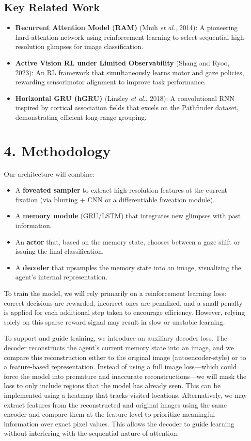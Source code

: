 \documentclass[12pt,a4paper]{article}
\begin{document}
\subsection*{Key Related Work}
\begin{itemize}[leftmargin=*]
  \item \textbf{Recurrent Attention Model (RAM)} (Mnih \emph{et al.}, 2014): A pioneering hard-attention network using reinforcement learning to select sequential high-resolution glimpses for image classification.
  \item \textbf{Active Vision RL under Limited Observability} (Shang and Ryoo, 2023): An RL framework that simultaneously learns motor and gaze policies, rewarding sensorimotor alignment to improve task performance.
  \item \textbf{Horizontal GRU (hGRU)} (Linsley \emph{et al.}, 2018): A convolutional RNN inspired by cortical association fields that excels on the Pathfinder dataset, demonstrating efficient long-range grouping.
\end{itemize}

\section*{4. Methodology}
Our architecture will combine:
\begin{itemize}[leftmargin=*]
  \item A \textbf{foveated sampler} to extract high-resolution features at the current fixation (via blurring + CNN or a differentiable foveation module).
  \item A \textbf{memory module} (GRU/LSTM) that integrates new glimpses with past information.
  \item An \textbf{actor} that, based on the memory state, chooses between a gaze shift or issuing the final classification.
  \item A \textbf{decoder} that upsamples the memory state into an image, visualizing the agent’s internal representation.
\end{itemize}

To train the model, we will rely primarily on a reinforcement learning loss: correct decisions are rewarded, incorrect ones are penalized, and a small penalty is applied for each additional step taken to encourage efficiency. However, relying solely on this sparse reward signal may result in slow or unstable learning.

To support and guide training, we introduce an auxiliary decoder loss. The decoder reconstructs the agent’s current memory state into an image, and we compare this reconstruction either to the original image (autoencoder-style) or to a feature-based representation. Instead of using a full image loss—which could force the model into premature and inaccurate reconstructions—we will mask the loss to only include regions that the model has already seen. This can be implemented using a heatmap that tracks visited locations. Alternatively, we may extract features from the reconstructed and original images using the same encoder and compare them at the feature level to prioritize meaningful information over exact pixel values. This allows the decoder to guide learning without interfering with the sequential nature of attention.
\end{document}
